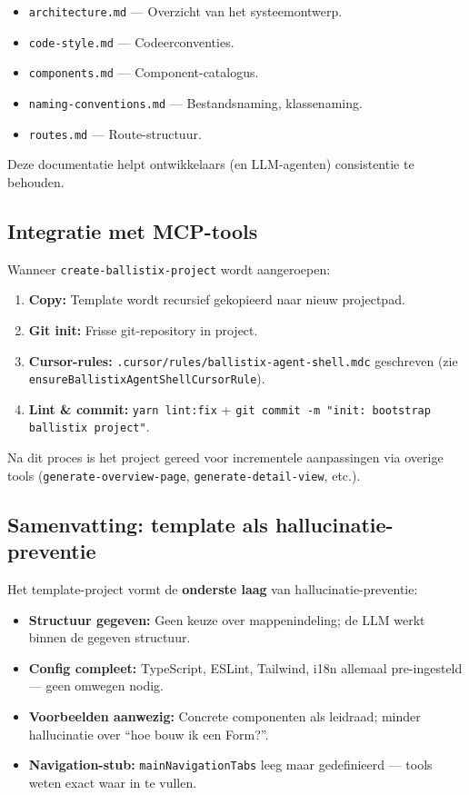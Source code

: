 \begin{itemize}
  \item \texttt{architecture.md} — Overzicht van het systeemontwerp.
  \item \texttt{code-style.md} — Codeerconventies.
  \item \texttt{components.md} — Component-catalogus.
  \item \texttt{naming-conventions.md} — Bestandsnaming, klassenaming.
  \item \texttt{routes.md} — Route-structuur.
\end{itemize}

Deze documentatie helpt ontwikkelaars (en LLM-agenten) consistentie te behouden.

\subsection{Integratie met MCP-tools}

Wanneer \texttt{create-ballistix-project} wordt aangeroepen:

\begin{enumerate}
  \item \textbf{Copy:} Template wordt recursief gekopieerd naar nieuw projectpad.
  \item \textbf{Git init:} Frisse git-repository in project.
  \item \textbf{Cursor-rules:} \texttt{.cursor/rules/ballistix-agent-shell.mdc} geschreven (zie \texttt{ensureBallistixAgentShellCursorRule}).
  \item \textbf{Lint \& commit:} \texttt{yarn lint:fix} + \texttt{git commit -m "init: bootstrap ballistix project"}.
\end{enumerate}

Na dit proces is het project gereed voor incrementele aanpassingen via overige tools (\texttt{generate-overview-page}, \texttt{generate-detail-view}, etc.).

\subsection{Samenvatting: template als hallucinatie-preventie}

Het template-project vormt de \textbf{onderste laag} van hallucinatie-preventie:

\begin{itemize}
  \item \textbf{Structuur gegeven:} Geen keuze over mappenindeling; de LLM werkt binnen de gegeven structuur.
  \item \textbf{Config compleet:} TypeScript, ESLint, Tailwind, i18n allemaal pre-ingesteld — geen omwegen nodig.
  \item \textbf{Voorbeelden aanwezig:} Concrete componenten als leidraad; minder hallucinatie over ``hoe bouw ik een Form?''.
  \item \textbf{Navigation-stub:} \texttt{mainNavigationTabs} leeg maar gedefinieerd — tools weten exact waar in te vullen.
\end{itemize}

